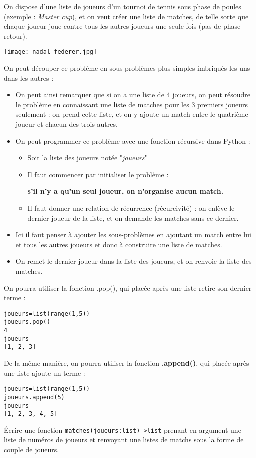 On dispose d'une liste de joueurs d'un tournoi de tennis sous phase de poules (exemple : \textit{Master cup}), et on veut créer une liste de matches, de telle sorte que chaque joueur joue contre tous les autres joueurs une seule fois (pas de phase retour).

\begin{center}
\texttt{[image: nadal-federer.jpg]}
\end{center}

On peut découper ce problème en sous-problèmes plus simples imbriqués les uns dans les autres :
\begin{itemize}
\item On peut ainsi remarquer que si on a une liste de 4 joueurs, on peut résoudre le problème en connaissant une liste de matches pour les 3 premiers joueurs seulement : on prend cette liste, et on y ajoute un match entre le quatrième joueur et chacun des trois autres.


\item On peut programmer ce problème avec une fonction récursive dans Python :

\begin{itemize}
\item Soit la liste des joueurs notée "\textit{joueurs}"
\item Il faut commencer par initialiser le problème :

\textbf{s'il n'y a qu'un seul joueur, on n'organise aucun match.}


\item Il faut donner une relation de récurrence (récurcivité) :
on enlève le dernier joueur de la liste, et on demande les matches sans ce dernier.
\end{itemize}


\item Ici il faut penser à ajouter les sous-problèmes en ajoutant un match entre lui et tous les autres joueurs et donc à construire une liste de matches.
\item On remet le dernier joueur dans la liste des joueurs, et on renvoie la liste des matches.
\end{itemize}



On pourra utiliser la fonction .pop(), qui placée après une liste retire son dernier terme :

\begin{lstlisting}
joueurs=list(range(1,5))
joueurs.pop()
4
joueurs
[1, 2, 3]
\end{lstlisting}
De la même manière, on pourra utiliser la fonction \textbf{.append()}, qui placée après une liste ajoute un terme :

\begin{lstlisting}
joueurs=list(range(1,5))
joueurs.append(5)
joueurs
[1, 2, 3, 4, 5]
\end{lstlisting}

\question{} Écrire une fonction \texttt{matches(joueurs:list)->list} prenant en argument une liste de numéros de joueurs et renvoyant une listes de matchs sous la forme de couple de joueurs.



